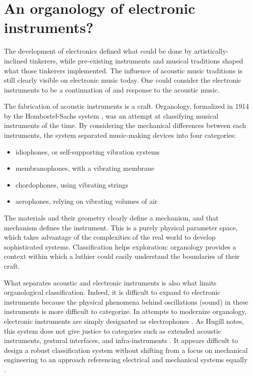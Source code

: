 \section{An organology of electronic instruments?}  

The development of electronics defined what could be done by artistically-inclined tinkerers, while pre-existing instruments and musical traditions shaped what those tinkerers implemented. The influence of acoustic music traditions is still clearly visible on electronic music today. One could consider the electronic instruments to be a continuation of and response to the acoustic music. 

The fabrication of acoustic instruments is a craft. Organology, formalized in 1914 by the Hombostel-Sachs system \cite{von1961}, was an attempt at classifying musical instruments of the time. By considering the mechanical differences between each instruments, the system separated music-making devices into four categories: 

\begin{itemize}
	\item idiophones, or self-supporting vibration systems
	\item membranophones, with a vibrating membrane
	\item chordophones, using vibrating strings
	\item aerophones, relying on vibrating volumes of air
\end{itemize}

The materials and their geometry clearly define a mechanism, and that mechanism defines the instrument. This is a purely physical parameter space, which takes advantage of the complexities of the real world to develop sophisticated systems. Classification helps exploration: organology provides a context within which a luthier could easily understand the boundaries of their craft. 

What separates acoustic and electronic instruments is also what limits organological classification. Indeed, it is difficult to expand to electronic instruments because the physical phenomena behind oscillations (sound) in these instruments is more difficult to categorize. In attempts to modernize organology, electronic instruments are simply designated as electrophones \cite{hugill2012}. As Hugill notes, this system does not give justice to categories such as extended acoustic instruments, gestural interfaces, and infra-instruments \cite{bowers2005}. It appears difficult to design a robust classification system without shifting from a focus on mechanical engineering to an approach referencing electrical and mechanical systems equally \cite{haslett2005}. 

